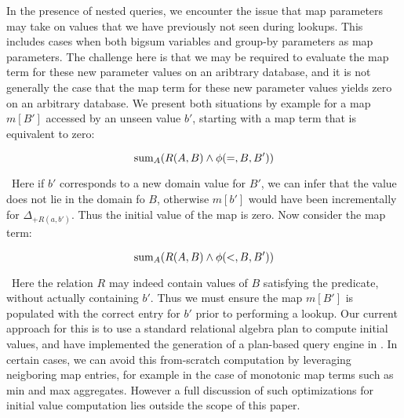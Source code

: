 
In the presence of nested queries, we encounter the issue that map parameters
may take on values that we have previously not seen during lookups.  This
includes cases when both bigsum variables and group-by parameters as map
parameters.  The challenge here is that we may be required to evaluate the map
term for these new parameter values on an aribtrary database, and it is not
generally the case that the map term for these new parameter values yields zero
on an arbitrary database. We present both situations by example for a map
$m[B']$ accessed by an unseen value $b'$, starting with a map term that is equivalent to zero:

\[\mathrm{sum}_{A}(R(A,B) \wedge \phi(=,B,B'))\]

\noindent~Here if $b'$ corresponds to a new domain value for $B'$, we can infer
that the value does not lie in the domain fo $B$, otherwise $m[b']$ would have
been incrementally for $\Delta_{+R(a,b')}$. Thus the initial value of the map is
zero. Now consider the map term:

\[\mathrm{sum}_{A}(R(A,B)\wedge \phi(<, B, B'))\]

\noindent~Here the relation $R$ may indeed contain values of $B$ satisfying the
predicate, without actually containing $b'$. Thus we must ensure the map $m[B']$
is populated with the correct entry for $b'$ prior to performing a lookup. Our
current approach for this is to use a standard relational algebra plan to
compute initial values, and have implemented the generation of a plan-based
query engine in \compiler. In certain cases, we can avoid this from-scratch
computation by leveraging neigboring map entries, for example in the case of
monotonic map terms such as min and max aggregates. However a full discussion of
such optimizations for initial value computation lies outside the scope of this
paper.


